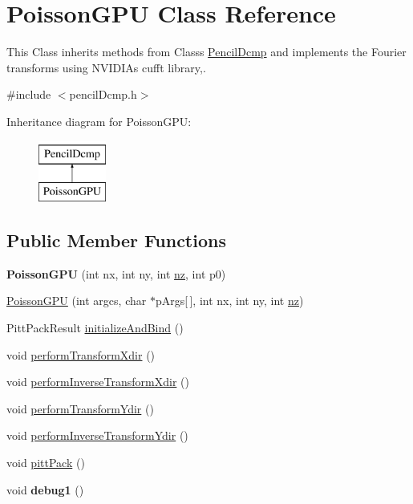 \hypertarget{classPoissonGPU}{}\section{Poisson\+G\+PU Class Reference}
\label{classPoissonGPU}


This Class inherits methods from Classs \mbox{\hyperlink{classPencilDcmp}{Pencil\+Dcmp}} and implements the Fourier transforms using N\+V\+I\+D\+IA\textquotesingle{}s cufft library,.  




{\ttfamily \#include $<$pencil\+Dcmp.\+h$>$}

Inheritance diagram for Poisson\+G\+PU\+:\begin{figure}[H]
\begin{center}
\leavevmode
\includegraphics[height=2.000000cm]{classPoissonGPU}
\end{center}
\end{figure}
\subsection*{Public Member Functions}
\begin{DoxyCompactItemize}
\item 
\mbox{\label{classPoissonGPU_a8236a46153275611638da77c5e5c119c}} 
{\bfseries Poisson\+G\+PU} (int nx, int ny, int \mbox{\hyperlink{classPencilDcmp_aedb528abdba6fa4a541af83f851e11c8}{nz}}, int p0)
\item 
\mbox{\hyperlink{classPoissonGPU_a01e1c31e5d5ebd8531fd157662c79d87}{Poisson\+G\+PU}} (int argcs, char $\ast$p\+Args\mbox{[}$\,$\mbox{]}, int nx, int ny, int \mbox{\hyperlink{classPencilDcmp_aedb528abdba6fa4a541af83f851e11c8}{nz}})
\item 
Pitt\+Pack\+Result \mbox{\hyperlink{classPoissonGPU_a172436deb694a44058fdc8ecc237a996}{initialize\+And\+Bind}} ()
\item 
void \mbox{\hyperlink{classPoissonGPU_ab6d57e72e0d430bd0559a4361c94f26a}{perform\+Transform\+Xdir}} ()
\item 
void \mbox{\hyperlink{classPoissonGPU_a433c2c82152b2a80a29d2287c722d22d}{perform\+Inverse\+Transform\+Xdir}} ()
\item 
void \mbox{\hyperlink{classPoissonGPU_a4ce36fbe9dd30759e3e2dab6c27d7913}{perform\+Transform\+Ydir}} ()
\item 
void \mbox{\hyperlink{classPoissonGPU_a8105313f683d3cfc983ee90da970be32}{perform\+Inverse\+Transform\+Ydir}} ()
\item 
void \mbox{\hyperlink{classPoissonGPU_a8d96442f1906d0952014d4be8cdcad30}{pitt\+Pack}} ()
\item 
\mbox{\label{classPoissonGPU_a5d143017fdb84de0843d61c405419663}} 
void {\bfseries debug1} ()
\end{DoxyCompactItemize}
